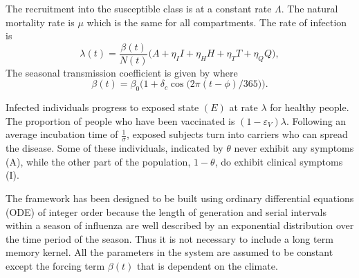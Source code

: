 \documentclass[12pt,a4paper]{article}
\theoremstyle{definition}
\theoremstyle{remark}
\begin{document}
The recruitment into the susceptible class is at a constant rate $\Lambda$. The natural mortality rate is $\mu$ which is the same for all compartments. The rate of infection is
\begin{equation}
\lambda(t)=\frac{\beta(t)}{N(t)}\bigl(A+\eta_I I+\eta_H H+\eta_T T+\eta_Q Q\bigr),
\end{equation}
The seasonal transmission coefficient is given by where
\begin{equation}
\beta(t)=\beta_0\bigl(1+\delta_c\cos\bigl(2\pi(t-\phi)/365\bigr)\bigr).
\end{equation}

Infected individuals progress to exposed state $(E)$ at rate $\lambda$ for healthy people. The proportion of people who have been vaccinated is $(1-\varepsilon_V)\lambda$. Following an average incubation time of $\frac{1}{\sigma}$, exposed subjects turn into carriers who can spread the disease. Some of these individuals, indicated by $\theta$ never exhibit any symptoms (A), while the other part of the population, $1-\theta$, do exhibit clinical symptoms (I).


The framework has been designed to be built using ordinary differential equations (ODE) of integer order because the length of generation and serial intervals within a season of influenza are well described by an exponential distribution over the time period of the season. Thus it is not necessary to include a long term memory kernel. All the parameters in the system are assumed to be constant except the forcing term $\beta(t)$ that is dependent on the climate. 
\end{document}
